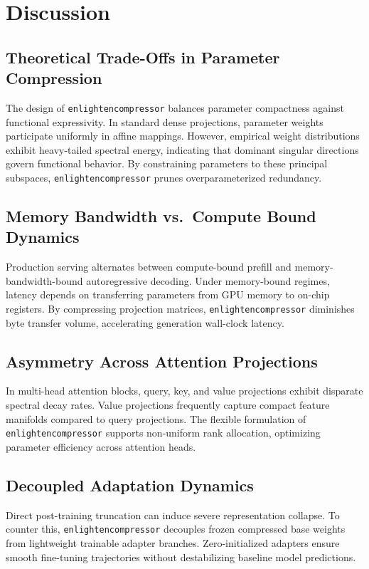 \section{Discussion}

\subsection{Theoretical Trade-Offs in Parameter Compression}
The design of \texttt{enlightencompressor} balances parameter compactness against functional expressivity. In standard dense projections, parameter weights participate uniformly in affine mappings. However, empirical weight distributions exhibit heavy-tailed spectral energy, indicating that dominant singular directions govern functional behavior. By constraining parameters to these principal subspaces, \texttt{enlightencompressor} prunes overparameterized redundancy.

\subsection{Memory Bandwidth vs.\ Compute Bound Dynamics}
Production serving alternates between compute-bound prefill and memory-bandwidth-bound autoregressive decoding. Under memory-bound regimes, latency depends on transferring parameters from GPU memory to on-chip registers. By compressing projection matrices, \texttt{enlightencompressor} diminishes byte transfer volume, accelerating generation wall-clock latency.

\subsection{Asymmetry Across Attention Projections}
In multi-head attention blocks, query, key, and value projections exhibit disparate spectral decay rates. Value projections frequently capture compact feature manifolds compared to query projections. The flexible formulation of \texttt{enlightencompressor} supports non-uniform rank allocation, optimizing parameter efficiency across attention heads.

\subsection{Decoupled Adaptation Dynamics}
Direct post-training truncation can induce severe representation collapse. To counter this, \texttt{enlightencompressor} decouples frozen compressed base weights from lightweight trainable adapter branches. Zero-initialized adapters ensure smooth fine-tuning trajectories without destabilizing baseline model predictions.

